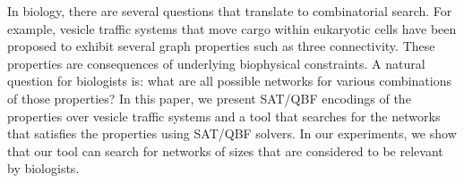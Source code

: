 In biology, there are several questions that translate to combinatorial
search. For example, vesicle traffic systems that move cargo within
eukaryotic cells have been proposed to exhibit several graph properties
such as three connectivity. These properties are consequences of underlying
biophysical constraints. A natural question for biologists is: what are all
possible networks for various combinations of those properties? In this
paper, we present SAT/QBF encodings of the properties over vesicle traffic
systems and a tool that searches for the networks that satisfies the
properties using SAT/QBF solvers. In our experiments, we show that our tool
can search for networks of sizes that are considered to be relevant by
biologists.




